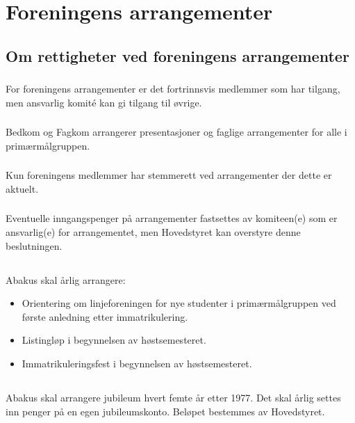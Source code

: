 \section{Foreningens arrangementer}

\subsection{Om rettigheter ved foreningens arrangementer}
\subsubsection{}
For foreningens arrangementer er det fortrinnsvis medlemmer som har tilgang, men ansvarlig komité kan gi tilgang til øvrige.

\subsubsection{}
Bedkom og Fagkom arrangerer presentasjoner og faglige arrangementer for alle i primærmålgruppen.

\subsubsection{}
Kun foreningens medlemmer har stemmerett ved arrangementer der dette er aktuelt.

\subsubsection{}
Eventuelle inngangspenger på arrangementer fastsettes av komiteen(e) som er
ansvarlig(e) for arrangementet, men Hovedstyret kan overstyre denne
beslutningen.

\subsection{}
Abakus skal årlig arrangere:

\begin{itemize}
  \item Orientering om linjeforeningen for nye studenter i primærmålgruppen ved første anledning etter immatrikulering.
  \item Listingløp i begynnelsen av høstsemesteret.
  \item Immatrikuleringsfest i begynnelsen av høstsemesteret.
\end{itemize}

\subsection{}
Abakus skal arrangere jubileum hvert femte år etter 1977. Det skal årlig settes inn penger
på en egen jubileumskonto. Beløpet bestemmes av Hovedstyret.
